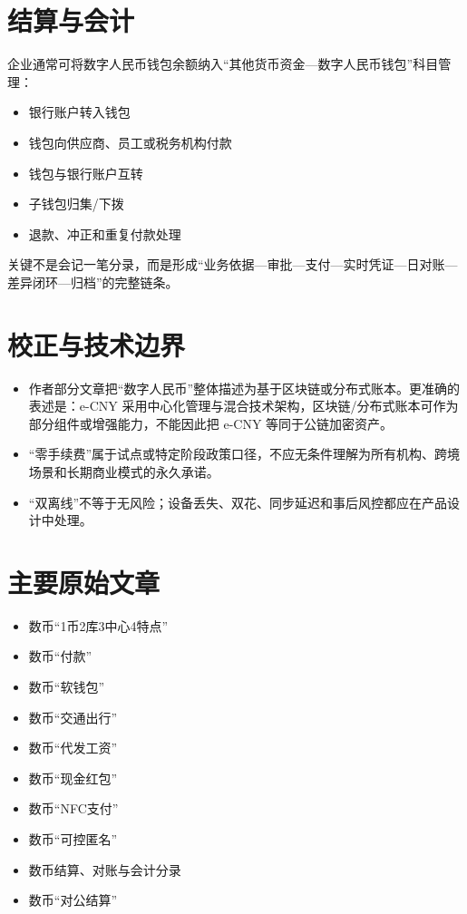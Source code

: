 \section{结算与会计}\label{ux7ed3ux7b97ux4e0eux4f1aux8ba1}

企业通常可将数字人民币钱包余额纳入``其他货币资金---数字人民币钱包''科目管理：

\begin{itemize}
\tightlist
\item
  银行账户转入钱包
\item
  钱包向供应商、员工或税务机构付款
\item
  钱包与银行账户互转
\item
  子钱包归集/下拨
\item
  退款、冲正和重复付款处理
\end{itemize}

关键不是会记一笔分录，而是形成``业务依据---审批---支付---实时凭证---日对账---差异闭环---归档''的完整链条。

\section{校正与技术边界}\label{ux6821ux6b63ux4e0eux6280ux672fux8fb9ux754c}

\begin{itemize}
\tightlist
\item
  作者部分文章把``数字人民币''整体描述为基于区块链或分布式账本。更准确的表述是：e-CNY
  采用中心化管理与混合技术架构，区块链/分布式账本可作为部分组件或增强能力，不能因此把
  e-CNY 等同于公链加密资产。
\item
  ``零手续费''属于试点或特定阶段政策口径，不应无条件理解为所有机构、跨境场景和长期商业模式的永久承诺。
\item
  ``双离线''不等于无风险；设备丢失、双花、同步延迟和事后风控都应在产品设计中处理。
\end{itemize}

\section{主要原始文章}\label{ux4e3bux8981ux539fux59cbux6587ux7ae0}

\begin{itemize}
\tightlist
\item
  数币``1币2库3中心4特点''
\item
  数币``付款''
\item
  数币``软钱包''
\item
  数币``交通出行''
\item
  数币``代发工资''
\item
  数币``现金红包''
\item
  数币``NFC支付''
\item
  数币``可控匿名''
\item
  数币结算、对账与会计分录
\item
  数币``对公结算''
\end{itemize}

